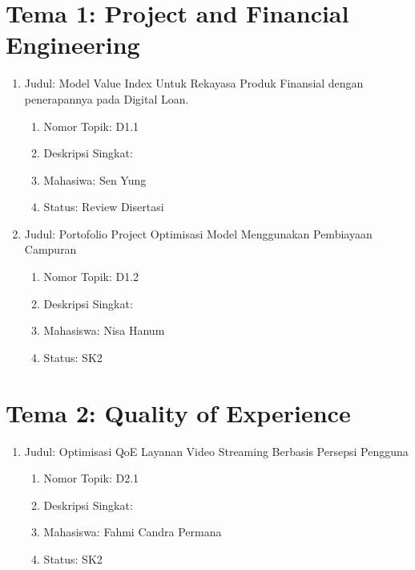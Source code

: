 \documentclass[
  letterpaper,
  DIV=11,
  numbers=noendperiod]{scrreprt}
\begin{document}
\section{Tema 1: Project and Financial
Engineering}\label{tema-1-project-and-financial-engineering-2}

\begin{enumerate}
\def\labelenumi{\arabic{enumi}.}
\item
  Judul: Model Value Index Untuk Rekayasa Produk Finansial dengan
  penerapannya pada Digital Loan.

  \begin{enumerate}
  \def\labelenumii{\arabic{enumii}.}
  \item
    Nomor Topik: D1.1
  \item
    Deskripsi Singkat:
  \item
    Mahasiwa: Sen Yung
  \item
    Status: Review Disertasi
  \end{enumerate}
\item
  Judul: Portofolio Project Optimisasi Model Menggunakan Pembiayaan
  Campuran

  \begin{enumerate}
  \def\labelenumii{\arabic{enumii}.}
  \item
    Nomor Topik: D1.2
  \item
    Deskripsi Singkat:
  \item
    Mahasiswa: Nisa Hanum
  \item
    Status: SK2
  \end{enumerate}
\end{enumerate}

\section{Tema 2: Quality of
Experience}\label{tema-2-quality-of-experience-2}

\begin{enumerate}
\def\labelenumi{\arabic{enumi}.}
\item
  Judul: Optimisasi QoE Layanan Video Streaming Berbasis Persepsi
  Pengguna

  \begin{enumerate}
  \def\labelenumii{\arabic{enumii}.}
  \item
    Nomor Topik: D2.1
  \item
    Deskripsi Singkat:
  \item
    Mahasiswa: Fahmi Candra Permana
  \item
    Status: SK2
  \end{enumerate}
\end{enumerate}
\end{document}
